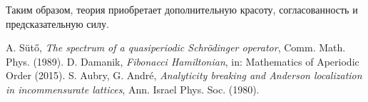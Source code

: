 \documentclass[12pt,a4paper]{article}
\begin{document}
Таким образом, теория приобретает дополнительную красоту, согласованность и предсказательную силу.


\begin{thebibliography}{9}
 A. Sütő, \emph{The spectrum of a quasiperiodic Schrödinger operator}, Comm. Math. Phys. (1989).
 D. Damanik, \emph{Fibonacci Hamiltonian}, in: Mathematics of Aperiodic Order (2015).
 S. Aubry, G. André, \emph{Analyticity breaking and Anderson localization in incommensurate lattices}, Ann. Israel Phys. Soc. (1980).
\end{thebibliography}
\end{document}
